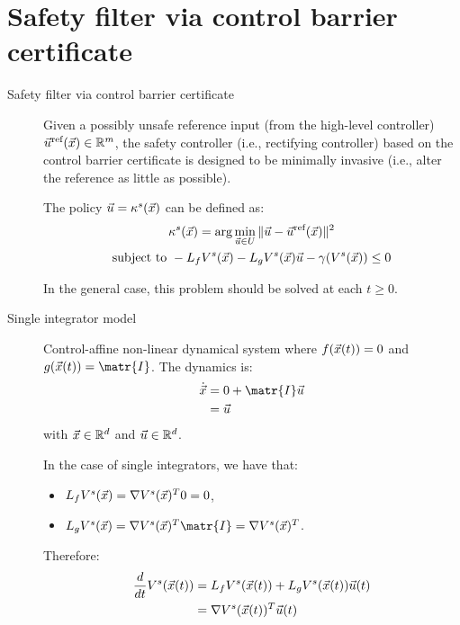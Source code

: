\section{Safety filter via control barrier certificate}

\begin{description}
    \item[Safety filter via control barrier certificate] 
        Given a possibly unsafe reference input (from the high-level controller) ${\vec{u}}^\text{ref}({\vec{x}}) \in \mathbb{R}^m$, the safety controller (i.e., rectifying controller) based on the control barrier certificate is designed to be minimally invasive (i.e., alter the reference as little as possible). 
        
        The policy ${\vec{u}} = \kappa^s({\vec{x}})$ can be defined as:
        \[
            \begin{gathered}
                \kappa^s({\vec{x}}) = \arg\min_{{\vec{u}} \in U} \Vert {\vec{u}} - {\vec{u}}^\text{ref}({\vec{x}}) \Vert^2 \\
                \text{subject to } -L_fV^s({\vec{x}}) - L_gV^s({\vec{x}}){\vec{u}} - \gamma(V^s({\vec{x}})) \leq 0
            \end{gathered}
        \]

        \begin{remark}
            In the general case, this problem should be solved at each $t \geq 0$.
        \end{remark}


    \item[Single integrator model] 
        Control-affine non-linear dynamical system where $f({\vec{x}}(t)) = 0$ and $g(\x(t)) = \matr{I}$. The dynamics is:
        \[
            \begin{split}
                \dot{\x} 
                &= 0 + \matr{I}\u \\ 
                &= \u
            \end{split}
        \]
        with ${\vec{x}} \in \mathbb{R}^d$ and ${\vec{u}} \in \mathbb{R}^d$.

        \begin{remark}
            In the case of single integrators, we have that:
           \begin{itemize}
            \item $L_f V^s({\vec{x}}) = \nabla V^s({\vec{x}})^T 0 = 0$,
            \item $L_g V^s(\x) = \nabla V^s(\x)^T \matr{I} = \nabla V^s(\x)^T$.
           \end{itemize}
           Therefore:
           \[
                \begin{split}
                    \frac{d}{dt} V^s({\vec{x}}(t)) 
                    &= L_f V^s({\vec{x}}(t)) + L_g V^s({\vec{x}}(t)) {\vec{u}}(t) \\
                    &= \nabla V^s({\vec{x}}(t))^T {\vec{u}}(t)
                \end{split}
           \]
        \end{remark}
\end{description}


